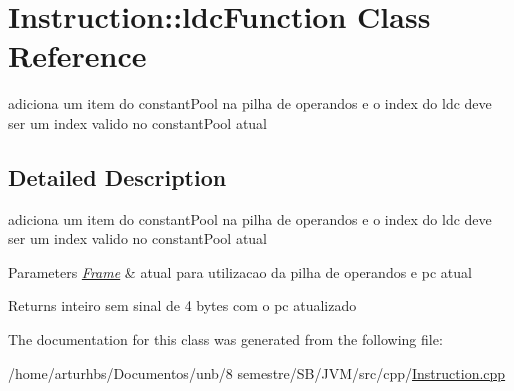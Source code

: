 \hypertarget{classInstruction_1_1ldcFunction}{}\section{Instruction\+:\+:ldc\+Function Class Reference}
\label{classInstruction_1_1ldcFunction}


adiciona um item do constant\+Pool na pilha de operandos e o index do ldc deve ser um index valido no constant\+Pool atual  




\subsection{Detailed Description}
adiciona um item do constant\+Pool na pilha de operandos e o index do ldc deve ser um index valido no constant\+Pool atual 


\begin{DoxyParams}{Parameters}
{\em \hyperlink{classFrame}{Frame}} & atual para utilizacao da pilha de operandos e pc atual \\
\hline
\end{DoxyParams}
\begin{DoxyReturn}{Returns}
inteiro sem sinal de 4 bytes com o pc atualizado 
\end{DoxyReturn}


The documentation for this class was generated from the following file\+:\begin{DoxyCompactItemize}
\item 
/home/arturhbs/\+Documentos/unb/8 semestre/\+S\+B/\+J\+V\+M/src/cpp/\hyperlink{Instruction_8cpp}{Instruction.\+cpp}\end{DoxyCompactItemize}
